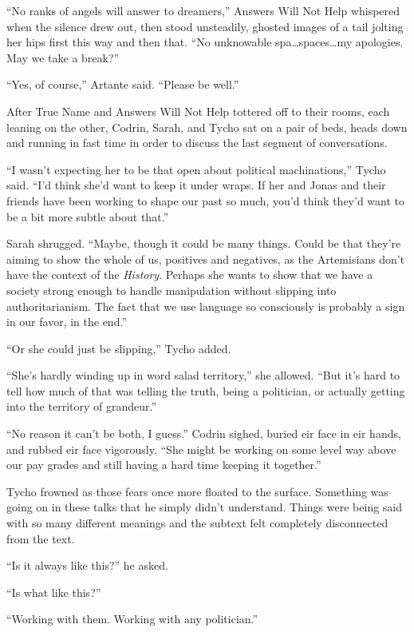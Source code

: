 ``No ranks of angels will answer to dreamers,'' Answers Will Not Help whispered when the silence drew out, then stood unsteadily, ghosted images of a tail jolting her hips first this way and then that. ``No unknowable spa\ldots spaces\ldots my apologies. May we take a break?''

``Yes, of course,'' Artante said. ``Please be well.''

After True Name and Answers Will Not Help tottered off to their rooms, each leaning on the other, Codrin, Sarah, and Tycho sat on a pair of beds, heads down and running in fast time in order to discuss the last segment of conversations.

``I wasn't expecting her to be that open about political machinations,'' Tycho said. ``I'd think she'd want to keep it under wraps. If her and Jonas and their friends have been working to shape our past so much, you'd think they'd want to be a bit more subtle about that.''

Sarah shrugged. ``Maybe, though it could be many things. Could be that they're aiming to show the whole of us, positives and negatives, as the Artemisians don't have the context of the \emph{History}. Perhaps she wants to show that we have a society strong enough to handle manipulation without slipping into authoritarianism. The fact that we use language so consciously is probably a sign in our favor, in the end.''

``Or she could just be slipping,'' Tycho added.

``She's hardly winding up in word salad territory,'' she allowed. ``But it's hard to tell how much of that was telling the truth, being a politician, or actually getting into the territory of grandeur.''

``No reason it can't be both, I guess.'' Codrin sighed, buried eir face in eir hands, and rubbed eir face vigorously. ``She might be working on some level way above our pay grades and still having a hard time keeping it together.''

Tycho frowned as those fears once more floated to the surface. Something was going on in these talks that he simply didn't understand. Things were being said with so many different meanings and the subtext felt completely disconnected from the text.

``Is it always like this?'' he asked.

``Is what like this?''

``Working with them. Working with any politician.''

